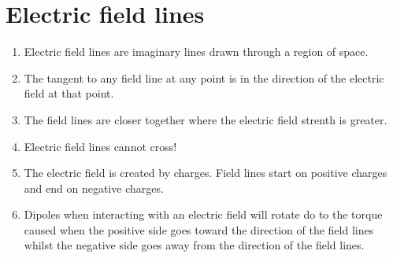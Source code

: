 \documentclass{report}
\begin{document}
\section{Electric field lines}
\begin{enumerate}
  \item Electric field lines are imaginary lines drawn through a region of space. 
  \item The tangent to any field line at any point is in the direction  of the electric field at that point.
  \item The  field lines are closer together where the electric field strenth is greater.
  \item Electric field lines cannot cross!
  \item The electric field is created by charges. Field lines start  on positive charges and end on negative charges.
  \item Dipoles when interacting with an  electric field will  rotate do to the torque caused when the positive side goes toward the direction of the field lines whilst the negative side goes away from the direction of the field lines.
\end{enumerate}
\end{document}

